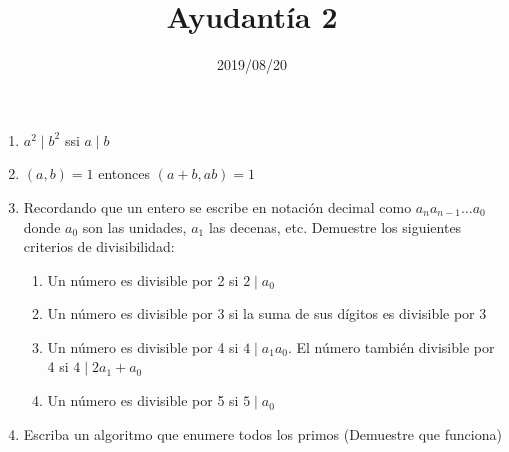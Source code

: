 \documentclass{ayudantia}
\title{Ayudantía 2}
\date{2019/08/20}
\begin{document}
\maketitle
\begin{enumerate}
    \item \(a^2\mid b^2\) ssi \(a\mid b\)
    \item \((a,b)=1\) entonces \((a+b,ab)=1\)
    \item Recordando que un entero se escribe en notación decimal como \(a_na_{n-1}\dots a_0\) donde \(a_0\)
    son las unidades, \(a_1\) las decenas, etc. Demuestre los siguientes criterios de divisibilidad:
    \begin{enumerate}
        \item Un número es divisible por 2 si \(2\mid a_0\)
        \item Un número es divisible por 3 si la suma de sus dígitos es divisible por 3
        \item Un número es divisible por 4 si \(4\mid a_1a_0\). El número también divisible por 4 si \(4\mid 2a_1+a_0\)
        \item Un número es divisible por 5 si \(5\mid a_0\)
    \end{enumerate}
    \item Escriba un algoritmo que enumere todos los primos (Demuestre que funciona)
\end{enumerate}
\end{document}
